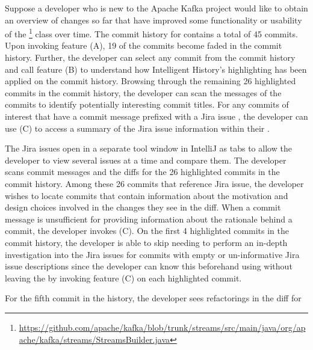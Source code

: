 Suppose a developer who is new to the Apache Kafka project would like to obtain an overview of changes so far that have improved some functionality or usability of the \footnote{\url{https://github.com/apache/kafka/blob/trunk/streams/src/main/java/org/apache/kafka/streams/StreamsBuilder.java}} class over time.
The commit history for  contains a total of 45 commits.
Upon invoking feature (A), 19 of the commits become faded in the commit history.
Further, the developer can select any commit from the commit history and call feature (B) to understand how Intelligent History's highlighting has been applied on the  commit history.
Browsing through the remaining 26 highlighted commits in the  commit history, the developer can scan the messages of the commits to identify potentially interesting commit titles.
For any commits of interest that have a commit message prefixed with a Jira issue , the developer can use (C) to access a summary of the Jira issue information within their .

The Jira issues open in a separate tool window in IntelliJ as tabs to allow the developer to view several issues at a time and compare them.
The developer scans commit messages and the diffs for the 26 highlighted commits in the  commit history.
Among these 26 commits that reference Jira issue, the developer wishes to locate commits that contain information about the motivation and design choices involved in the changes they see in the diff.
When a commit message is unsufficient for providing information about the rationale behind a commit, the developer invokes (C).
On the first 4 highlighted commits in the commit history, the developer is able to skip needing to perform an in-depth investigation into the Jira issues for commits with empty or un-informative Jira issue descriptions since the developer can know this beforehand using without leaving the  by invoking feature (C) on each highlighted commit.

For the fifth commit in the history, the developer sees refactorings in the diff for 

\begin{center}
\end{center}

